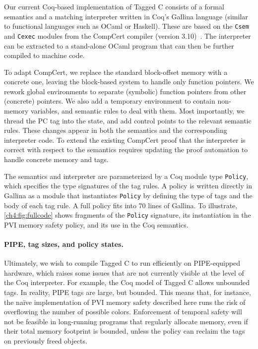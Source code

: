 Our current Coq-based implementation of Tagged C consists of a formal semantics and
a matching interpreter written in Coq's Gallina language (similar to functional
languages such as OCaml or Haskell).
These are based on the {\tt Csem} and {\tt Cexec} modules from the CompCert compiler
(version 3.10)~\cite{CompCert3.10}.  The interpreter can be extracted to a stand-alone OCaml program
that can then be further compiled to machine code.

To adapt CompCert, we replace the standard block-offset memory with a concrete one,
leaving the block-based system to handle only function pointers. We rework
global environments to separate (symbolic) function pointers from other (concrete)
pointers. %
We also add a temporary environment to contain non-memory variables,
and semantic rules to deal with them. Most importantly, we thread the PC tag into the state,
and add control points to the relevant semantic rules. These changes appear in both
the semantics and the corresponding interpreter code. 
To extend the existing CompCert proof that the interpreter is correct with respect to the semantics
requires updating the proof automation to handle concrete memory and tags.

The semantics and interpreter are parameterized by a Coq module type {\tt Policy}, which specifies
the type signatures of the tag rules. A policy is written directly in Gallina as a module that
instantiates {\tt Policy} by defining the type of tags and the body of each tag rule.
A full policy fits into 70 lines of Gallina. 
To illustrate, \cref{ch4:fig:fullcode} shows fragments of the {\tt Policy} signature, its instantiation
in the PVI memory safety policy, and its use in the Coq semantics.

\paragraph{PIPE, tag sizes, and policy states.}
Ultimately, we wish to compile Tagged C to run efficiently on PIPE-equipped hardware, which
raises some issues that are not currently visible at the level of the Coq interpreter. For example,
the Coq model of Tagged C allows unbounded tags. In reality, PIPE tags are large, but
bounded. This means that, for instance, the na\"{i}ve implementation of PVI memory safety
described here runs the risk of overflowing the number of possible colors. 
Enforcement of temporal safety will not be feasible in long-running programs that regularly allocate memory,
even if their total memory footprint is bounded, unless the policy can reclaim the tags
on previously freed objects. 

